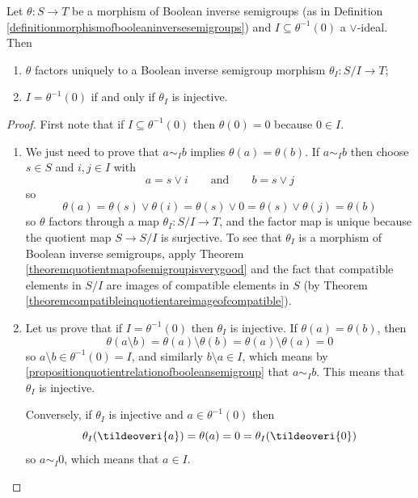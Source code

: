 \begin{theorem}
Let $\theta:S\to T$ be a morphism of Boolean inverse semigroups (as in Definition \ref{definitionmorphismofbooleaninversesemigroups}) and $I\subseteq\theta^{-1}(0)$ a $\lor$-ideal. Then
\begin{enumerate}
\item[(a)] $\theta$ factors uniquely to a Boolean inverse semigroup morphism $\theta_I:S/I\to T$;
\item[(b)] $I=\theta^{-1}(0)$ if and only if $\theta_I$ is injective.
\end{enumerate}
\end{theorem}
\begin{proof}
First note that if $I\subseteq\theta^{-1}(0)$ then $\theta(0)=0$ because $0\in I$.

\begin{enumerate}
\item[(a)] We just need to prove that $a\sim_I b$ implies $\theta(a)=\theta(b)$. If $a\sim_I b$ then choose $s\in S$ and $i,j\in I$ with
\[a=s\lor i\qquad\text{and}\qquad b=s\lor j\]
so
\[\theta(a)=\theta(s)\lor\theta(i)=\theta(s)\lor 0=\theta(s)\lor\theta(j)=\theta(b)\]
so $\theta$ factors through a map $\theta_I:S/I\to T$, and the factor map is unique because the quotient map $S\to S/I$ is surjective. To see that $\theta_I$ is a morphism of Boolean inverse semigroups, apply Theorem \ref{theoremquotientmapofsemigroupisverygood} and the fact that compatible elements in $S/I$ are images of compatible elements in $S$ (by Theorem \ref{theoremcompatibleinquotientareimageofcompatible}).
\item[(b)] Let us prove that if $I=\theta^{-1}(0)$ then $\theta_I$ is injective. If $\theta(a)=\theta(b)$, then
\[\theta(a\setminus b)=\theta(a)\setminus\theta(b)=\theta(a)\setminus\theta(a)=0\]
so $a\setminus b\in\theta^{-1}(0)=I$, and similarly $b\setminus a\in I$, which means by \ref{propositionquotientrelationofbooleansemigroup} that $a\sim_I b$. This means that $\theta_I$ is injective.

Conversely, if $\theta_I$ is injective and $a\in\theta^{-1}(0)$ then
\[\theta_I(\tildeoveri{a})=\theta(a)=0=\theta_I(\tildeoveri{0})\]
so $a\sim_I 0$, which means that $a\in I$.\qedhere
\end{enumerate}
\end{proof}